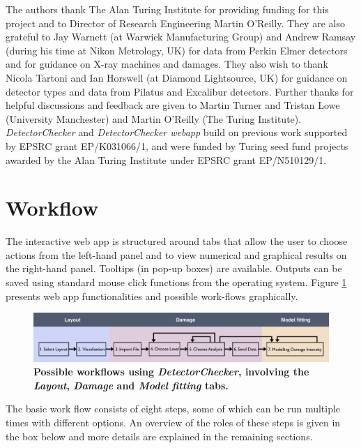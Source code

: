 \documentclass[11pt,a4paper]{article}
\newcommand{\DetectorChecker}{\emph{DetectorChecker}\xspace}
\newcommand{\DetectorCheckerWebApp}{\emph{DetectorChecker webapp}\xspace}
\begin{document}
The authors thank The Alan Turing Institute for providing funding for this project and to Director of Research Engineering Martin O'Reilly. They are also grateful to Jay Warnett (at Warwick Manufacturing Group) and Andrew Ramsay (during his time at Nikon Metrology, UK) for data from Perkin Elmer detectors and for guidance on X-ray machines and damages. They also wish to thank Nicola Tartoni and Ian Horswell (at Diamond Lightsource, UK) for guidance on detector types and data from Pilatus and Excalibur detectors. Further thanks for helpful discussions and feedback are given
to Martin Turner and Tristan Lowe (University Manchester) and Martin O'Reilly (The Turing Institute).
\DetectorChecker and \DetectorCheckerWebApp build on previous work supported by EPSRC grant EP/K031066/1, and were funded by Turing seed fund projects awarded by the Alan Turing Institute under EPSRC grant EP/N510129/1.



\section{Workflow}\label{flow}

The interactive web app is structured around tabs that allow the user to choose actions from the left-hand panel and to view numerical and graphical results on the right-hand panel. Tooltips (in pop-up boxes) are available.
Outputs can be saved using standard mouse click functions from the operating system. 
Figure \ref{fig_flowchart} presents web app functionalities and possible work-flows
graphically.

\begin{figure}[htbp]
	\begin{center}
		\includegraphics[width=14.5cm]{flowchartDCshort.pdf}
		\vspace{-7mm}
		\caption
		{
			{\bfseries 
				Possible workflows using \DetectorChecker, involving
				the \emph{Layout}, \emph{Damage} and
				\emph{Model fitting} tabs.}
		}
		\label{fig_flowchart}
	\end{center}
\end{figure}
The basic work flow consists of eight steps, some of which can be run multiple times with different options. 
An overview of the roles of these steps is given in the box below and more details are explained in the remaining sections.
\end{document}
